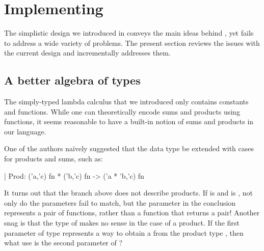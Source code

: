 \section{Implementing \arti}
\label{sec:representation}

The simplistic design we introduced in  conveys the main ideas
behind \arti, yet fails to address a wide variety of problems. The present section
reviews the issues with the current design and incrementally addresses them.

\subsection{A better algebra of types}
\label{sec:algebra}

The simply-typed lambda calculus that we introduced only contains constants and
functions. While one can theoretically encode sums and products using functions,
it seems reasonable to have a built-in notion of sums and products in our
language.

One of the authors naïvely suggested that the data type be extended with cases
for products and sums, such as:
%
\begin{ocamlcode}
| Prod: ('a,'c) fn * ('b,'c) fn -> ('a * 'b,'c) fn
\end{ocamlcode}
%
It turns out that the branch above does not describe products. If  is
 and  is , not only do the
 parameters fail to match, but the  parameter in the
conclusion represents a pair of functions, rather than a function that returns a
pair! Another snag is that the type of  makes no sense in the case of
a product. If the first parameter of type  represents a way to
obtain a  from the product type , then what use is the second
parameter of ?

